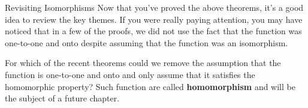 \begin{section}{Revisiting Isomorphisms}
Now that you've proved the above theorems, it's a good idea to review the key themes.  If you were really paying attention, you may have noticed that in a few of the proofs, we did not use the fact that the function was one-to-one and onto despite assuming that the function was an isomorphism.

\begin{problem}
For which of the recent theorems could we remove the assumption that the function is one-to-one and onto and only assume that it satisfies the homomorphic property?  Such function are called \textbf{homomorphism} and will be the subject of a future chapter.
\end{problem}


\end{section}